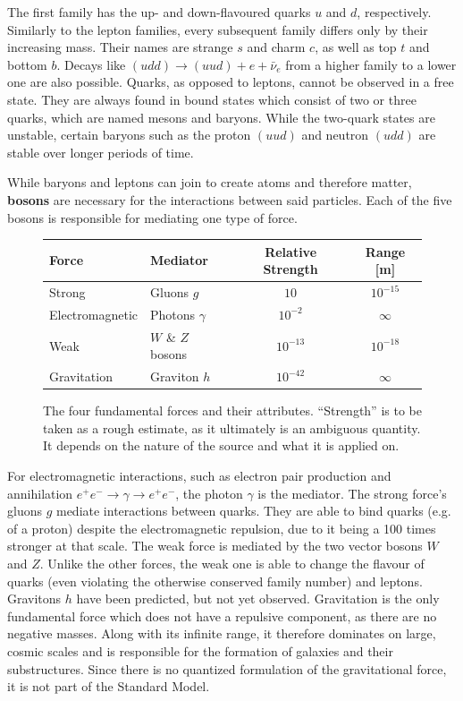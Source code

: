 The first family has the up- and down-flavoured quarks $u$ and $d$, respectively. Similarly to the lepton families, every subsequent family differs only by their increasing mass. Their names are strange $s$ and charm $c$, as well as top $t$ and bottom $b$. Decays like $(udd) \rightarrow (uud) + e + \bar{\nu}_e$ from a higher family to a lower one are also possible. Quarks, as opposed to leptons, cannot be observed in a free state. They are always found in bound states which consist of two or three quarks, which are named mesons and baryons. While the two-quark states are unstable, certain baryons such as the proton $(uud)$ and neutron $(udd)$ are stable over longer periods of time.


While baryons and leptons can join to create atoms and therefore matter, \textbf{bosons} are necessary for the interactions between said particles. Each of the five bosons is responsible for mediating one type of force.

\begin{figure}
  \centering
  \begin{tabular}{ | l | l | c | c | }
    \hline
    Force               & Mediator              & Relative Strength     & Range [m] \\ \hline
    Strong              & Gluons $g$            & $10$                  & $10^{-15}$  \\
    Electromagnetic     & Photons $\gamma$      & $10^{-2}$              & $\infty$  \\
    Weak                & $W$ \& $Z$ bosons     & $10^{-13}$             & $10^{-18}$  \\
    Gravitation         & Graviton $h$          & $10^{-42}$             & $\infty$  \\
    \hline  
  \end{tabular}
  \caption{The four fundamental forces and their attributes. ``Strength'' is to be taken as a rough estimate, as it ultimately is an ambiguous quantity. It depends on the nature of the source and what it is applied on.}
  \label{tab:fundforces}
\end{figure}

For electromagnetic interactions, such as electron pair production and annihilation $e^+ e^- \rightarrow \gamma \rightarrow e^+ e^-$, the photon $\gamma$ is the mediator. The strong force's gluons $g$ mediate interactions between quarks. They are able to bind quarks (e.g. of a proton) despite the electromagnetic repulsion, due to it being a 100 times stronger at that scale. The weak force is mediated by the two vector bosons $W$ and $Z$. Unlike the other forces, the weak one is able to change the flavour of quarks (even violating the otherwise conserved family number) and leptons. Gravitons $h$ have been predicted, but not yet observed. Gravitation is the only fundamental force which does not have a repulsive component, as there are no negative masses. Along with its infinite range, it therefore dominates on large, cosmic scales and is responsible for the formation of galaxies and their substructures. Since there is no quantized formulation of the gravitational force, it is not part of the Standard Model.


